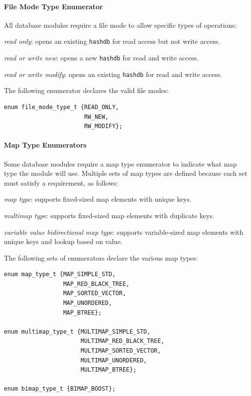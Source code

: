 \documentclass[10pt,twoside]{article}
\newcommand{\hdb}{\texttt{hashdb}\xspace}
\begin{document}
\paragraph{File Mode Type Enumerator}
All database modules require a file mode to allow specific types of operations:
\begin{compactitem}
\item \emph{read only}: opens an existing \hdb for read access but not write access.
\item \emph{read or write new}: opens a new \hdb for read and write access.
\item \emph{read or write modify}: opens an existing \hdb for read and write access.
\end{compactitem}
The following enumerator declares the valid file modes:
\begin{small}
\begin{verbatim}
enum file_mode_type_t {READ_ONLY,
                       RW_NEW,
                       RW_MODIFY};
\end{verbatim}
\end{small}

\paragraph{Map Type Enumerators}
Some database modules require a map type enumerator to indicate what map type the module will use.
Multiple sets of map types are defined because each set must satisfy a requirement, as follows:
\begin{compactitem}
\item \emph{map type}: supports fixed-sized map elements with unique keys.
\item \emph{multimap type}: supports fixed-sized map elements with duplicate keys.
\item \emph{variable value bidirectional map type}: supports variable-sized map elements with unique keys
and lookup based on value.
\end{compactitem}
The following sets of enumerators declare the various map types:
\begin{small}
\begin{verbatim}
enum map_type_t {MAP_SIMPLE_STD,
                 MAP_RED_BLACK_TREE,
                 MAP_SORTED_VECTOR,
                 MAP_UNORDERED,
                 MAP_BTREE};

enum multimap_type_t {MULTIMAP_SIMPLE_STD,
                      MULTIMAP_RED_BLACK_TREE,
                      MULTIMAP_SORTED_VECTOR,
                      MULTIMAP_UNORDERED,
                      MULTIMAP_BTREE};

enum bimap_type_t {BIMAP_BOOST};
\end{verbatim}
\end{small}
\end{document}

